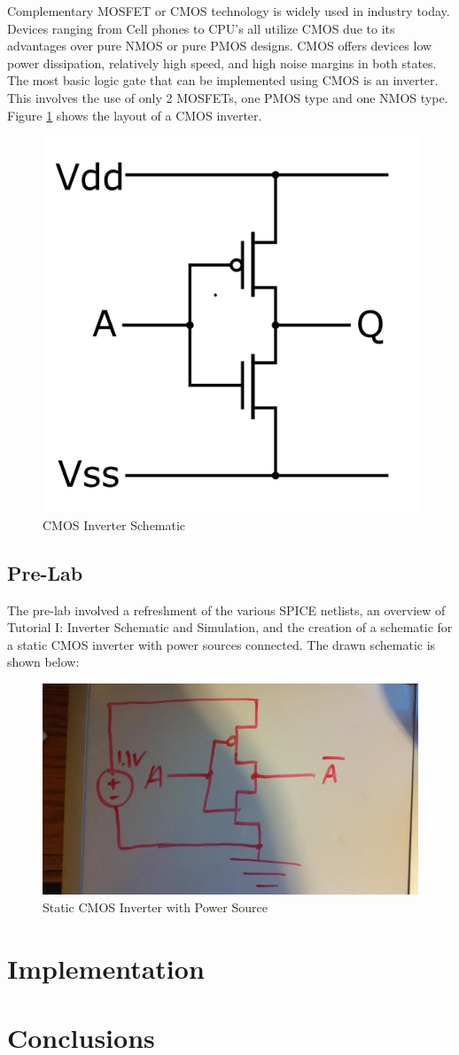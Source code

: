 \documentclass[12pt]{article}
\begin{document}
Complementary MOSFET or CMOS technology is widely used in industry today. Devices ranging from Cell phones to CPU's all utilize CMOS due to its advantages over pure NMOS or pure PMOS designs. CMOS offers devices low power dissipation, relatively high speed, and high noise margins in both states. The most basic logic gate that can be implemented using CMOS is an inverter. This involves the use of only 2 MOSFETs, one PMOS type and one NMOS type. Figure \ref{fig:inverter} shows the layout of a CMOS inverter. 
\begin{figure}[H]
\centering
\includegraphics[width=0.4\linewidth]{inverter}
\caption{CMOS Inverter Schematic}
\label{fig:inverter}
\end{figure}


\subsection{Pre-Lab}
The pre-lab involved a refreshment of the various SPICE netlists, an overview of Tutorial I: Inverter Schematic and Simulation, and the creation of a schematic for a static CMOS inverter with power sources connected. The drawn schematic is shown below:
\begin{figure}[H]
\centering
\includegraphics[width=1.0\linewidth]{prelab}
\caption{Static CMOS Inverter with Power Source}
\label{fig:prelab}
\end{figure}

\section{Implementation}

\section{Conclusions}
\end{document}
